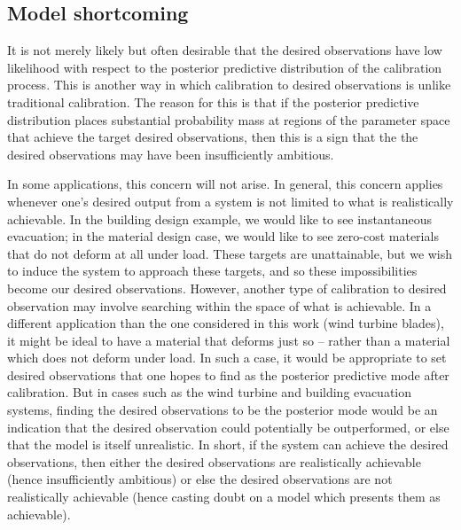 \documentclass{article}
\begin{document}
\subsection{Model shortcoming}\label{model_shortcoming}

It is not merely likely but often desirable that the desired observations have low likelihood with respect to the posterior predictive distribution of the calibration process. This is another way in which calibration to desired observations is unlike traditional calibration. The reason for this is that if the posterior predictive distribution places substantial probability mass at regions of the parameter space that achieve the target desired observations, then this is a sign that the the desired observations may have been insufficiently ambitious. 

In some applications, this concern will not arise. In general, this concern applies whenever one's desired output from a system is not limited to what is realistically achievable. In the building design example, we would like to see instantaneous evacuation; in the material design case, we would like to see zero-cost materials that do not deform at all under load. These targets are unattainable, but we wish to induce the system to approach these targets, and so these impossibilities become our desired observations. However, another type of calibration to desired observation may involve searching within the space of what is achievable. In a different application than the one considered in this work (wind turbine blades), it might be ideal to have a material that deforms just so -- rather than a material which does not deform under load. In such a case, it would be appropriate to set desired observations that one hopes to find as the posterior predictive mode after calibration. But in cases such as the wind turbine and building evacuation systems, finding the desired observations to be the posterior mode would be an indication that the desired observation could potentially be outperformed, or else that the model is itself unrealistic. In short, if the system can achieve the desired observations, then either the desired observations are realistically achievable (hence insufficiently ambitious) or else the desired observations are not realistically achievable (hence casting doubt on a model which presents them as achievable).
\end{document}
